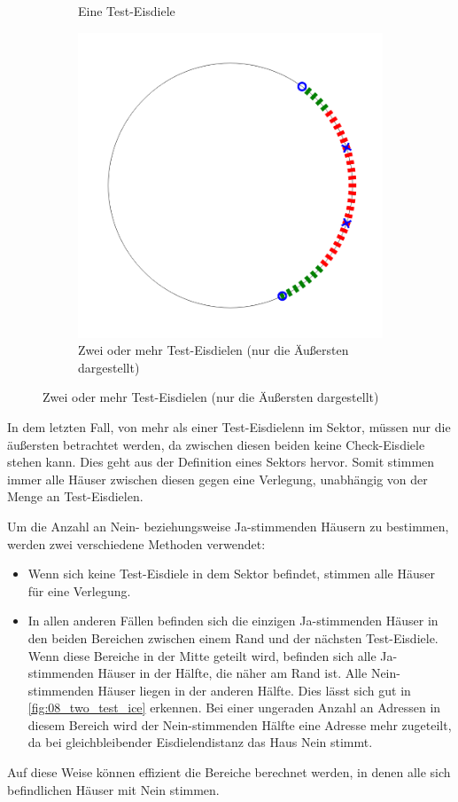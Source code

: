 \documentclass[a4paper,10pt,ngerman,captions=figureheading]{scrartcl}
\newcommand{\imageWidth}{0.3\linewidth}
\begin{document}
\begin{figure}[h!t]
\begin{subfigure}[t]{\imageWidth}
        \caption{Eine Test-Eisdiele}
        \label{fig:07_one_test_ice}
    \end{subfigure}
    \begin{subfigure}[t]{\imageWidth}
        \includegraphics[width=\linewidth]{08_two_test_ice.png}
        \caption{Zwei oder mehr Test-Eisdielen (nur die Äußersten dargestellt)}
        \label{fig:08_two_test_ice}
    \end{subfigure}
\end{figure}

In dem letzten Fall, von mehr als einer Test-Eisdielenn im Sektor, müssen nur die äußersten betrachtet werden, da zwischen diesen beiden keine Check-Eisdiele stehen kann.
Dies geht aus der Definition eines Sektors hervor.
Somit stimmen immer alle Häuser zwischen diesen gegen eine Verlegung, unabhängig von der Menge an Test-Eisdielen.

Um die Anzahl an Nein- beziehungsweise Ja-stimmenden Häusern zu bestimmen, werden zwei verschiedene Methoden verwendet:
\begin{itemize}
    \item Wenn sich keine Test-Eisdiele in dem Sektor befindet, stimmen alle Häuser für eine Verlegung.
    \item In allen anderen Fällen befinden sich die einzigen Ja-stimmenden Häuser in den beiden Bereichen zwischen einem Rand und der nächsten Test-Eisdiele.
          Wenn diese Bereiche in der Mitte geteilt wird, befinden sich alle Ja-stimmenden Häuser in der Hälfte, die näher am Rand ist.
          Alle Nein-stimmenden Häuser liegen in der anderen Hälfte.
          Dies lässt sich gut in \autoref{fig:08_two_test_ice} erkennen.
          Bei einer ungeraden Anzahl an Adressen in diesem Bereich wird der Nein-stimmenden Hälfte eine Adresse mehr zugeteilt, da bei gleichbleibender Eisdielendistanz das Haus Nein stimmt.
\end{itemize}
Auf diese Weise können effizient die Bereiche berechnet werden, in denen alle sich befindlichen Häuser mit Nein stimmen.
\end{document}
